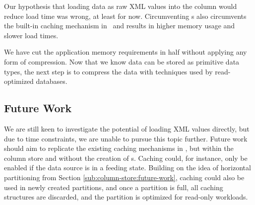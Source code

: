 Our hypothesis that loading data as raw XML values into the column would reduce load time was wrong, at least for now. Circumventing s also circumvents the built-in caching mechanism in \gap~and results in higher memory usage and slower load times.  

We have cut the application memory requirements in half without applying any form of compression. Now that we know data can be stored as primitive data types, the next step is to compress the data with techniques used by read-optimized databases.

\subsection{Future Work}
\label{sub:Future Work}
We are still keen to investigate the potential of loading XML values directly, but due to time constraints, we are unable to pursue this topic further. Future work should aim to replicate the existing caching mechanisms in \gap, but within the column store and without the creation of s. Caching could, for instance, only be enabled if the data source is in a feeding state. Building on the idea of horizontal partitioning from Section \ref{sub:column-store:future-work}, caching could also be used in newly created partitions, and once a partition is full, all caching structures are discarded, and the partition is optimized for read-only workloads.



